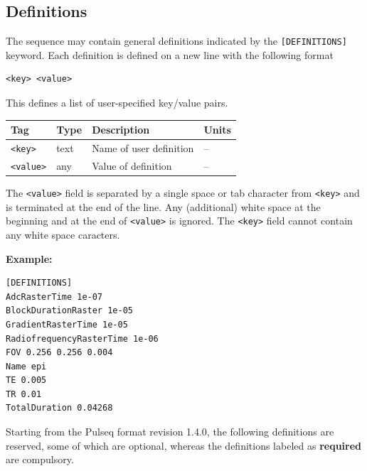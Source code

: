 \documentclass{article}
\begin{document}
\subsection{Definitions}

The sequence may contain general definitions indicated by the \verb.[DEFINITIONS]. keyword. Each definition is defined on a new line with the following format
\begin{lstlisting}
<key> <value>
\end{lstlisting}
This defines a list of user-specified key/value pairs.

\begin{tabularx}{\textwidth}{llXl}
\toprule
Tag & Type & Description & Units\\
\midrule
\verb.<key>. & text & Name of user definition & -- \\
\verb.<value>. & any & Value of definition & -- \\
\bottomrule
\end{tabularx}

The \verb.<value>. field is separated by a single space or tab character from \verb.<key>. and is terminated at the end of the line. Any (additional) white space at the beginning and at the end of \verb.<value>. is ignored. The \verb.<key>. field cannot contain any white space caracters.

\textbf{Example:}
\begin{lstlisting}
[DEFINITIONS]
AdcRasterTime 1e-07 
BlockDurationRaster 1e-05 
GradientRasterTime 1e-05 
RadiofrequencyRasterTime 1e-06 
FOV 0.256 0.256 0.004 
Name epi 
TE 0.005
TR 0.01
TotalDuration 0.04268 
\end{lstlisting}

Starting from the Pulseq format revision 1.4.0, the following definitions are reserved, some of which are optional, whereas the definitions labeled as \textbf{required} are compulsory.
\end{document}
